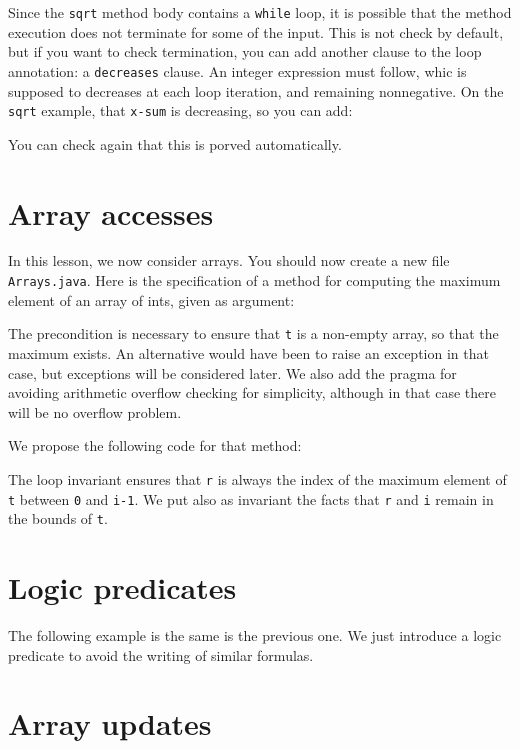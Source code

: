 \documentclass[a4paper,11pt,twoside,openright]{report}
\begin{document}
Since the \texttt{sqrt} method body contains a \texttt{while} loop, it
is possible that the method execution does not terminate for some of
the input. This is not check by default, but if you want to check
termination, you can add another clause to the loop annotation: a
\texttt{decreases} clause. An integer expression must follow, whic is
supposed to decreases at each loop iteration, and remaining
nonnegative. On the \texttt{sqrt} example, that \texttt{x-sum} is
decreasing, so you can add:


You can check again that this is porved automatically.

\section{Array accesses}

In this lesson, we now consider arrays. You should now create a new
file \verb|Arrays.java|. Here is the specification of a method for computing 
the maximum element of an array of ints, given as argument:

The precondition is necessary to ensure that \verb|t| is a non-empty
array, so that the maximum exists. An alternative would have been to
raise an exception in that case, but exceptions will be considered
later. We also add the pragma for avoiding arithmetic overflow
checking for simplicity, although in that case there will be no
overflow problem.

We propose the following code for that method:

The loop invariant ensures that \verb|r| is always the index of the maximum
element of \verb|t| between \verb|0| and \verb|i-1|. We put also as
invariant the facts that \verb|r| and \verb|i| remain in the bounds of
\verb|t|. 


\section{Logic predicates}


The following example is the same is the previous one. We just
introduce a logic predicate to avoid the writing of similar formulas.
 



\section{Array updates}
\end{document}
